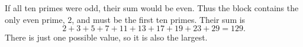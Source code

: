 If all ten primes were odd, their sum would be even. Thus the block contains the only even prime, $2$, and must be the first ten primes. Their sum is
\[
2+3+5+7+11+13+17+19+23+29=\boxed{129}.
\]
There is just one possible value, so it is also the largest.
